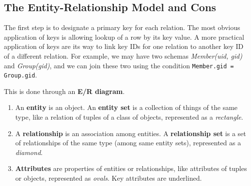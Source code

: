 \documentclass{article}
\begin{document}
  \subsection{The Entity-Relationship Model and Cons} 

    The first step is to designate a primary key for each relation. The most obvious application of keys is allowing lookup of a row by its key value. A more practical application of keys are its way to link key IDs for one relation to another key ID of a different relation. For example, we may have two schemas \textit{Member(uid, gid)} and \textit{Group(gid)}, and we can join these two using the condition \texttt{Member.gid = Group.gid}. 

    \begin{definition}
      This is done through an \textbf{E/R diagram}. 
      \begin{enumerate}
        \item An \textbf{entity} is an object. An \textbf{entity set} is a collection of things of the same type, like a relation of tuples of a class of objects, represented as a \textit{rectangle}. 
        \item A \textbf{relationship} is an association among entities. A \textbf{relationship set} is a set of relationships of the same type (among same entity sets), represented as a \textit{diamond}. 
        \item \textbf{Attributes} are properties of entities or relationships, like attributes of tuples or objects, represented as \textit{ovals}. Key attributes are underlined. 
      \end{enumerate}
    \end{definition}
\end{document}
